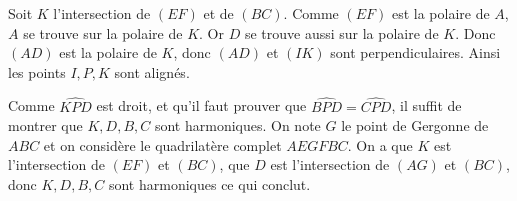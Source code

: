 Soit $K$ l'intersection de $(EF)$ et de $(BC)$. Comme $(EF)$ est la polaire de $A$, $A$ se trouve sur la polaire de $K$. Or $D$ se trouve aussi sur la polaire de $K$. Donc $(AD)$ est la polaire de $K$, donc $(AD)$ et $(IK)$ sont perpendiculaires. Ainsi les points $I, P, K$ sont alignés.

Comme $\widehat{KPD}$ est droit, et qu'il faut prouver que $\widehat{BPD} = \widehat{CPD}$, il suffit de montrer que $K, D, B, C$ sont harmoniques. On note $G$ le point de Gergonne de $ABC$ et on considère le quadrilatère complet $AEGFBC$. On a que $K$ est l'intersection de $(EF)$ et $(BC)$, que $D$ est l'intersection de $(AG)$ et $(BC)$, donc $K,D,B,C$ sont harmoniques ce qui conclut.